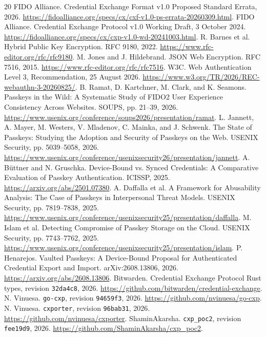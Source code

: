 \documentclass[letterpaper,twocolumn,10pt]{article}
\begin{document}
\begin{thebibliography}{20}
 FIDO Alliance. Credential Exchange Format v1.0 Proposed Standard Errata, 2026. \url{https://fidoalliance.org/specs/cx/cxf-v1.0-ps-errata-20260309.html}.
 FIDO Alliance. Credential Exchange Protocol v1.0 Working Draft, 3 October 2024. \url{https://fidoalliance.org/specs/cx/cxp-v1.0-wd-20241003.html}.
 R. Barnes et al. Hybrid Public Key Encryption. RFC 9180, 2022. \url{https://www.rfc-editor.org/rfc/rfc9180}.
 M. Jones and J. Hildebrand. JSON Web Encryption. RFC 7516, 2015. \url{https://www.rfc-editor.org/rfc/rfc7516}.
 W3C. Web Authentication Level 3, Recommendation, 25 August 2026. \url{https://www.w3.org/TR/2026/REC-webauthn-3-20260825/}.
 B. Ramat, D. Kartchner, M. Clark, and K. Seamons. Passkeys in the Wild: A Systematic Study of FIDO2 User Experience Consistency Across Websites. SOUPS, pp. 21--39, 2026. \url{https://www.usenix.org/conference/soups2026/presentation/ramat}.
 L. Jannett, A. Mayer, M. Westers, V. Mladenov, C. Mainka, and J. Schwenk. The State of Passkeys: Studying the Adoption and Security of Passkeys on the Web. USENIX Security, pp. 5039--5058, 2026. \url{https://www.usenix.org/conference/usenixsecurity26/presentation/jannett}.
 A. B{\"u}ttner and N. Gruschka. Device-Bound vs. Synced Credentials: A Comparative Evaluation of Passkey Authentication. ICISSP, 2025. \url{https://arxiv.org/abs/2501.07380}.
 A. Daffalla et al. A Framework for Abusability Analysis: The Case of Passkeys in Interpersonal Threat Models. USENIX Security, pp. 7819--7838, 2025. \url{https://www.usenix.org/conference/usenixsecurity25/presentation/daffalla}.
 M. Islam et al. Detecting Compromise of Passkey Storage on the Cloud. USENIX Security, pp. 7743--7762, 2025. \url{https://www.usenix.org/conference/usenixsecurity25/presentation/islam}.
 P. Henarejos. Vaulted Passkeys: A Device-Bound Proposal for Authenticated Credential Export and Import. arXiv:2608.13806, 2026. \url{https://arxiv.org/abs/2608.13806}.
 Bitwarden. Credential Exchange Protocol Rust types, revision \texttt{32da4c8}, 2026. \url{https://github.com/bitwarden/credential-exchange}.
 N. Vinuesa. \texttt{go-cxp}, revision \texttt{94659f3}, 2026. \url{https://github.com/nvinuesa/go-cxp}.
 N. Vinuesa. \texttt{cxporter}, revision \texttt{96bab31}, 2026. \url{https://github.com/nvinuesa/cxporter}.
 ShaminAkarsha. \texttt{cxp\_poc2}, revision \texttt{fee19d9}, 2026. \url{https://github.com/ShaminAkarsha/cxp_poc2}.

\end{thebibliography}
\end{document}
